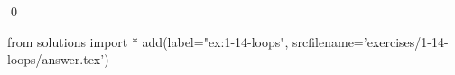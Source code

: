 
\begin{ex}
  \label{ex:1-14-loops}
  
  \qed
\end{ex}
\begin{python0}
from solutions import *
add(label="ex:1-14-loops",
    srcfilename='exercises/1-14-loops/answer.tex')
\end{python0}
